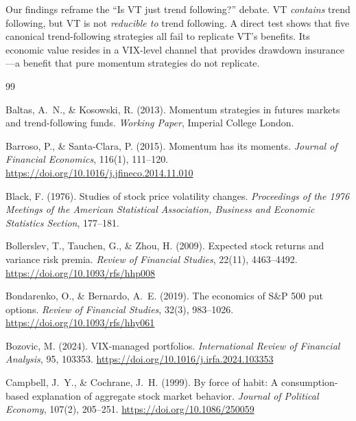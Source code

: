 Our findings reframe the ``Is VT just trend following?'' debate. VT \textit{contains} trend following, but VT is not \textit{reducible to} trend following. A direct test shows that five canonical trend-following strategies all fail to replicate VT's benefits. Its economic value resides in a VIX-level channel that provides drawdown insurance---a benefit that pure momentum strategies do not replicate.



\begin{thebibliography}{99}

Baltas, A.~N., \& Kosowski, R. (2013). Momentum strategies in futures markets and trend-following funds. \textit{Working Paper}, Imperial College London.

Barroso, P., \& Santa-Clara, P. (2015). Momentum has its moments. \textit{Journal of Financial Economics}, 116(1), 111--120. \url{https://doi.org/10.1016/j.jfineco.2014.11.010}

Black, F. (1976). Studies of stock price volatility changes. \textit{Proceedings of the 1976 Meetings of the American Statistical Association, Business and Economic Statistics Section}, 177--181.

Bollerslev, T., Tauchen, G., \& Zhou, H. (2009). Expected stock returns and variance risk premia. \textit{Review of Financial Studies}, 22(11), 4463--4492. \url{https://doi.org/10.1093/rfs/hhp008}

Bondarenko, O., \& Bernardo, A.~E. (2019). The economics of S\&P 500 put options. \textit{Review of Financial Studies}, 32(3), 983--1026. \url{https://doi.org/10.1093/rfs/hhy061}

Bozovic, M. (2024). VIX-managed portfolios. \textit{International Review of Financial Analysis}, 95, 103353. \url{https://doi.org/10.1016/j.irfa.2024.103353}

Campbell, J.~Y., \& Cochrane, J.~H. (1999). By force of habit: A consumption-based explanation of aggregate stock market behavior. \textit{Journal of Political Economy}, 107(2), 205--251. \url{https://doi.org/10.1086/250059}


\end{thebibliography}
